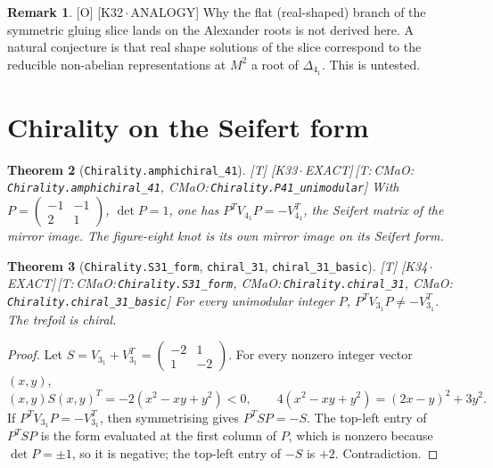 \documentclass[11pt]{article}
\newtheorem{theorem}{Theorem}
\theoremstyle{definition}
\newtheorem{remark}[theorem]{Remark}
\newcommand{\grade}[1]{\textsf{\small[#1]}}
\newcommand{\lean}[1]{\texttt{\small #1}}
\newcommand{\dtag}[1]{#1}
\begin{document}
\begin{remark}\label{rem:open}\grade{O}\dtag{ \textsf{\small[K32\,$\cdot$\,ANALOGY]}}
Why the flat (real-shaped) branch of the symmetric gluing slice lands on the Alexander roots is not derived here. A natural conjecture is that real shape solutions of the slice correspond to the reducible non-abelian representations at $M^2$ a root of $\Delta_{4_1}$. This is untested.
\end{remark}

\section{Chirality on the Seifert form}
\begin{theorem}[\lean{Chirality.amphichiral\_41}]\grade{T}\dtag{ \textsf{\small[K33\,$\cdot$\,EXACT]}\,\textsf{\small[T:\,CMaO:\,\lean{Chirality.\allowbreak{}amphichiral\_\allowbreak{}41}, CMaO:\,\lean{Chirality.\allowbreak{}P41\_\allowbreak{}unimodular}]}}
With $P=\begin{pmatrix}-1&-1\\2&1\end{pmatrix}$, $\det P=1$, one has $P^{T}V_{4_1}P=-V_{4_1}^{T}$, the Seifert matrix of the mirror image. The figure-eight knot is its own mirror image on its Seifert form.
\end{theorem}

\begin{theorem}[\lean{Chirality.S31\_form}, \lean{chiral\_31}, \lean{chiral\_31\_basic}]\grade{T}\dtag{ \textsf{\small[K34\,$\cdot$\,EXACT]}\,\textsf{\small[T:\,CMaO:\,\lean{Chirality.\allowbreak{}S31\_\allowbreak{}form}, CMaO:\,\lean{Chirality.\allowbreak{}chiral\_\allowbreak{}31}, CMaO:\,\lean{Chirality.\allowbreak{}chiral\_\allowbreak{}31\_\allowbreak{}basic}]}}
For every unimodular integer $P$, $P^{T}V_{3_1}P\neq-V_{3_1}^{T}$. The trefoil is chiral.
\end{theorem}
\begin{proof}
Let $S=V_{3_1}+V_{3_1}^{T}=\begin{pmatrix}-2&1\\1&-2\end{pmatrix}$. For every nonzero integer vector $(x,y)$,
\[ (x,y)S(x,y)^{T}=-2(x^2-xy+y^2)<0,\qquad 4(x^2-xy+y^2)=(2x-y)^2+3y^2 . \]
If $P^TV_{3_1}P=-V_{3_1}^T$, then symmetrising gives $P^TSP=-S$. The top-left entry of $P^TSP$ is the form evaluated at the first column of $P$, which is nonzero because $\det P=\pm1$, so it is negative; the top-left entry of $-S$ is $+2$. Contradiction.
\end{proof}
\end{document}
